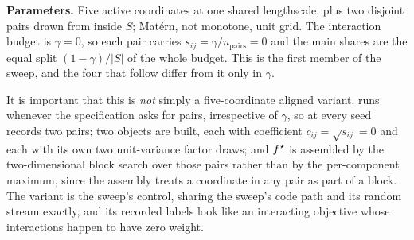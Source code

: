 \begin{table}[htbp]
  \centering
  \caption[: theoretical and realized slope shares]{
   rank by rank: the variance share, the lengthscale,
  $\vell{\ell_i}$, the slope factor $5/(3\ell_i^2\vell{\ell_i})$
  of~\eqref{app:so:a1:eq:slopefactor}, the theoretical slope share
  of~\eqref{app:so:a1:eq:slopeshare}, and the realized slope share label $g$
  averaged over the seeds. Mixed check class. Every column but the last is
  closed form, a deterministic function of the specification and of the
  quadrature~\eqref{app:so:a1:eq:vell}, and so is the first summary row. The
  mean realized column and the two remaining summary rows are draw-dependent:
  measured on the archived grid, seeds $0$--$9$, $D=\SOnumStudyD$, this
  machine's BLAS\@. The last two rows are deliberately \emph{different}
  statistics --- the seed-mean vector correlated against $s$, and every
  individual (seed, rank) pair pooled into one sample --- and the second is not
  recoverable from the mean realized column
  alone.}\label{app:so:a2:tab:anti-aligned}
  \small\setlength{\tabcolsep}{3pt}
  
\end{table}

\label{app:so:a2:interaction-g0-00}

\textbf{Parameters.} Five active coordinates at one shared lengthscale, plus
two disjoint pairs drawn from inside $S$; Mat\'ern, not monotone, unit grid.
The interaction budget is $\gamma=0$, so each pair carries
$s_{ij}=\gamma/n_{\text{pairs}}=0$ and the main shares are the equal split
$(1-\gamma)/|S|$ of the whole budget. This is the first member of the sweep,
and the four that follow differ from it only in $\gamma$.

It is important that this is \emph{not} simply a five-coordinate aligned
variant.  runs whenever the specification asks for pairs,
irrespective of $\gamma$, so at every seed  records two
pairs; two  objects are built, each with coefficient
$c_{ij}=\sqrt{s_{ij}}=0$ and each with its own two unit-variance factor draws;
and $f^\star$ is assembled by the two-dimensional block search over those pairs
rather than by the per-component maximum, since the assembly treats a
coordinate in any pair as part of a block. The variant is the sweep's control,
sharing the sweep's code path and its random stream exactly, and its recorded
labels look like an interacting objective whose interactions happen to have
zero weight.

